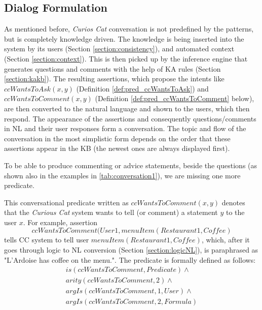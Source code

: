 \subsection{Dialog Formulation}
\label{section:dialog}
As mentioned before, \emph{Curios Cat} conversation is not predefined by the 
patterns, but is completely knowledge driven. The knowledge is being inserted
into the system by its users (Section \ref{section:consistency}), and automated
context (Section \ref{section:context}). This is then picked up by the 
inference engine that generates questions and comments with the help of KA rules
(Section \ref{section:kakb}). The resulting assertions, which propose the 
intents like $ccWantsToAsk(x,y)$ (Definition \ref{def:pred_ccWantsToAsk}) and
$ccWantsToComment(x,y)$ (Definition \ref{def:pred_ccWantsToComment} below), 
are then converted to the natural language and shown to the users, which then 
respond. The appearance of the assertions and consequently questions/comments
in NL and their user responses form a conversation. The topic and flow of the 
conversation in the most simplistic form depends on the order that these
assertions appear in the KB (the newest ones are always displayed first).

To be able to produce commenting or advice statements, beside the questions
(as shown also in the examples in \autoref{tab:conversation1}), we are missing
one more predicate.

\begin{definition}
\label{def:pred_ccWantsToComment}
This conversational predicate written as $ccWantsToComment(x,y)$ denotes that 
the \emph{Curious Cat} system wants to tell (or comment) a statement $y$ to
the user $x$. For example, assertion 
\begin{equation*}
ccWantsToComment(User1, menuItem(Restaurant1,Coffee)
\end{equation*}
tells CC system to tell user $menuItem(Restaurant1,Coffee)$, which,
after it goes through logic to NL conversion (Section \ref{section:logicNL}), 
is paraphrased as "L'Ardoise has coffee on the menu.". The predicate is 
formally defined as follows:
\begin{equation}\label{as:ccWantsToComment}
\begin{gathered}
	is(ccWantsToComment,Predicate) \land \\
	arity(ccWantsToComment,2) \land\\ 
	argIs(ccWantsToComment,1,User) \land \\
	argIs(ccWantsToComment,2,Formula)
\end{gathered}
\end{equation}
\end{definition}

